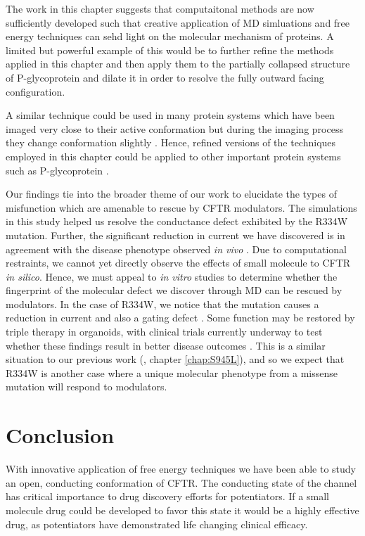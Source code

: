 The work in this chapter suggests that computaitonal methods are now sufficiently developed such that creative application of MD simluations and free energy techniques can sehd light on the molecular mechanism of proteins. A limited but powerful example of this would be to further refine the methods applied in this chapter and then apply them to the partially collapsed structure of P-glycoprotein and dilate it in order to resolve the fully outward facing configuration.

A similar technique could be used in many protein systems which have been imaged very close to their active conformation but during the imaging process they change conformation slightly \cite{bock2022}. Hence, refined versions of the techniques employed in this chapter could be applied to other important protein systems such as P-glycoprotein \cite{}.  %

Our findings tie into the broader theme of our work to elucidate the types of misfunction which are amenable to rescue by CFTR modulators. The simulations in this study helped us resolve the conductance defect exhibited by the R334W mutation. Further, the significant reduction in current we have discovered is in agreement with the disease phenotype observed \textit {in vivo} \cite{}. Due to computational restraints, we cannot yet directly observe the effects of small molecule to CFTR \textit{in silico}. Hence, we must appeal to \textit{in vitro} studies to determine whether the fingerprint of the molecular defect we discover through MD can be rescued by modulators. In the case of R334W, we notice that the mutation causes a reduction in current and also a gating defect \cite{}. Some function may be restored by triple therapy in organoids, with clinical trials currently underway to test whether these findings result in better disease outcomes \cite{}. This is a similar situation to our previous work (\cite{wong2022a, wong2022}, chapter \ref{chap:S945L}), and so we expect that R334W is another case where a unique molecular phenotype from a missense mutation will respond to modulators.

\section{Conclusion}
With innovative application of free energy techniques we have been able to study an open, conducting conformation of CFTR. The conducting state of the channel has critical importance to drug discovery efforts for potentiators. If a small molecule drug could be developed to favor this state it would be a highly effective drug, as potentiators have demonstrated life changing clinical efficacy.


